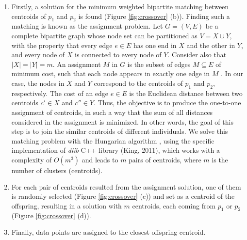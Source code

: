\begin{enumerate}

	\item Firstly, a solution for the minimum weighted bipartite matching between centroids of $p_1$ and $p_2$ is found (Figure \ref{fig:crossover} (b)). Finding such a matching is known as the assignment problem. Let $G = (V, E)$ be a complete bipartite graph whose node set can be partitioned as $V = X \cup Y$, with the property that every edge $e \in E$ has one end in $X$ and the other in $Y$, and every node of $X$ is connected to every node of $Y$. Consider also that $|X| = |Y| = m$. An assignment $M$ in $G$ is the subset of edges $M \subseteq E$ of minimum cost, such that each node appears in exactly one edge in $M$ \cite{tardos}. In our case, the nodes in $X$ and $Y$ correspond to the centroids of $p_1$ and $p_2$, respectively. The cost of an edge $e \in E$ is the Euclidean distance between two centroids $c' \in X$ and $c'' \in Y$. Thus, the objective is to produce the one-to-one assignment of centroids, in such a way that the sum of all distances considered in the assignment is minimized. In other words, the goal of this step is to join the similar centroids of different individuals. We solve this matching problem with the Hungarian algorithm \cite{Kuhn1955}, using the specific implementation of \textit{dlib} C++ library (King, 2011), which works with a complexity of $O(m^3)$ and leads to $m$ pairs of centroids, where $m$ is the number of clusters (centroids).


	\item For each pair of centroids resulted from the assignment solution, one of them is randomly selected (Figure \ref{fig:crossover} (c)) and set as a centroid of the offspring, resulting in a solution with $m$ centroids, each coming from $p_1$ or $p_2$ (Figure \ref{fig:crossover} (d)).

	\item Finally, data points are assigned to the closest offspring centroid.
\end{enumerate}

